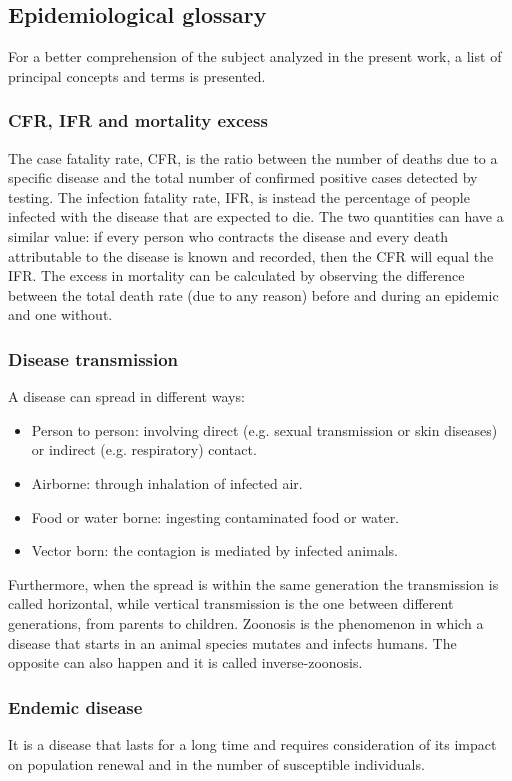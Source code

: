 \subsection{Epidemiological glossary}
\label{subsec:glossary}
For a better comprehension of the subject analyzed in the present work, a list of principal concepts and terms is presented. 

\subsubsection{CFR, IFR and mortality excess} The case fatality rate, CFR, is the ratio between the number of deaths due to a specific disease and the total number of confirmed positive cases detected by testing. 
The infection fatality rate, IFR, is instead the percentage of people infected with the disease that are expected to die. The two quantities can have a similar value: if every person who contracts the disease and every death attributable to the disease is known and recorded, then the CFR will equal the IFR.
The excess in mortality can be calculated by observing the difference between the total death rate (due to any reason) before and during an epidemic and one without. 


\subsubsection{Disease transmission} A disease can spread in different ways: 
	\begin{itemize}
		\item Person to person: involving direct (e.g. sexual transmission or skin diseases) or indirect (e.g. respiratory) contact.
		\item Airborne: through inhalation of infected air.
		\item Food or water borne: ingesting contaminated food or water. 
		\item Vector born: the contagion is mediated by infected animals.
	\end{itemize}
	Furthermore, when the spread is within the same generation the transmission is called horizontal, while vertical transmission is the one between different generations, from parents to children. 
	Zoonosis is the phenomenon in which a disease that starts in an animal species mutates and infects humans. The opposite can also happen and it is called inverse-zoonosis. 

\subsubsection{Endemic disease} It is a disease that lasts for a long time and requires consideration of its impact on population renewal and in the number of susceptible individuals.
	
